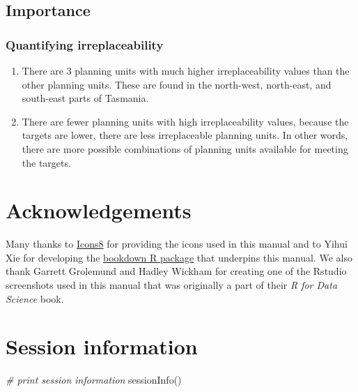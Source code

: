 \documentclass[
  12pt,
]{book}
\makeatletter
\newenvironment{Shaded}{\begin{snugshade}}{\end{snugshade}}
\newcommand{\CommentTok}[1]{\textcolor[rgb]{0.56,0.35,0.01}{\textit{#1}}}
\newcommand{\FunctionTok}[1]{\textcolor[rgb]{0.00,0.00,0.00}{#1}}
\newcommand{\NormalTok}[1]{#1}
\providecommand{\tightlist}{%
  \setlength{\itemsep}{0pt}\setlength{\parskip}{0pt}}
\newenvironment{kframe}{%
\medskip{}
\setlength{\fboxsep}{.8em}
 \def\at@end@of@kframe{}%
 \ifinner\ifhmode%
  \def\at@end@of@kframe{\end{minipage}}%
  \begin{minipage}{\columnwidth}%
 \fi\fi%
 \def\FrameCommand##1{\hskip\@totalleftmargin \hskip-\fboxsep
 \colorbox{shadecolor}{##1}\hskip-\fboxsep
     \hskip-\linewidth \hskip-\@totalleftmargin \hskip\columnwidth}%
 \MakeFramed {\advance\hsize-\width
   \@totalleftmargin\z@ \linewidth\hsize
   \@setminipage}}%
 {\par\unskip\endMakeFramed%
 \at@end@of@kframe}
\newenvironment{rmdblock}[1]
  {
  \begin{itemize}
  \renewcommand{\labelitemi}{
    \raisebox{-.7\height}[0pt][0pt]{
      {\setkeys{Gin}{width=3em,keepaspectratio}\texttt{[image: images/\#1]}}
    }
  }
  \setlength{\fboxsep}{1em}
  \begin{kframe}
  \item
  }
  {
  \end{kframe}
  \end{itemize}
  }
\newenvironment{rmdanswer}
  {\begin{rmdblock}{answer}}
  {\end{rmdblock}}
\makeatother
\begin{document}
\hypertarget{importance-1}{%
\section{Importance}\label{importance-1}}

\hypertarget{quantifying-irreplaceability-1}{%
\subsection{Quantifying irreplaceability}\label{quantifying-irreplaceability-1}}

\begin{rmdanswer}
\begin{enumerate}
\def\labelenumi{\arabic{enumi}.}
\tightlist
\item
  There are 3 planning units with much higher irreplaceability values than the other planning units. These are found in the north-west, north-east, and south-east parts of Tasmania.
\item
  There are fewer planning units with high irreplaceability values, because the targets are lower, there are less irreplaceable planning units. In other words, there are more possible combinations of planning units available for meeting the targets.
\end{enumerate}
\end{rmdanswer}

\hypertarget{acknowledgements}{%
\chapter{Acknowledgements}\label{acknowledgements}}

Many thanks to \href{https://icons8.com}{Icons8} for providing the icons used in this manual and to Yihui Xie for developing the \href{http://bookdown.org}{bookdown R package} that underpins this manual. We also thank Garrett Grolemund and Hadley Wickham for creating one of the Rstudio screenshots used in this manual that was originally a part of their \emph{R for Data Science} book.

\hypertarget{session-information}{%
\chapter{Session information}\label{session-information}}

\begin{Shaded}
\begin{Highlighting}[]
\CommentTok{\# print session information}
\FunctionTok{sessionInfo}\NormalTok{()}
\end{Highlighting}
\end{Shaded}
\end{document}
